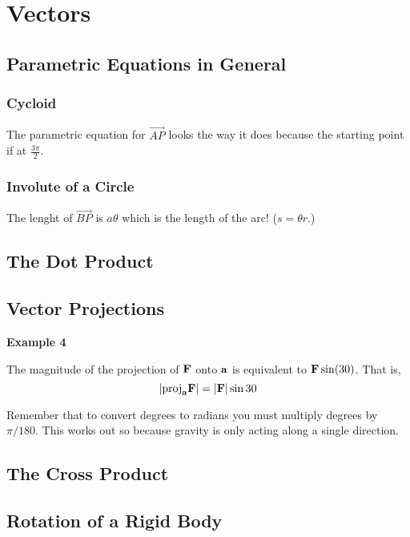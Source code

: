 \section{Vectors}

\subsection{Parametric Equations in General}

\subsubsection{Cycloid}

The parametric equation for $\overrightarrow{AP}$ looks the way it does because the starting point
if at $\frac{3\pi}{2}$.

\subsubsection{Involute of a Circle}

The lenght of $\overrightarrow{BP}$ is $a\theta$ which is the length of the arc! ($s=\theta r$.)


\subsection{The Dot Product}


\subsection{Vector Projections}

\textbf{Example 4}

The magnitude of the projection of $\boldsymbol{\mathbf{F}}$ onto $\boldsymbol{\mathbf{a}}$ is equivalent to $\boldsymbol{\mathbf{F}} \sin(30)$.
That is,
$$
|\text{proj}_{\boldsymbol{\mathbf{a}}} \boldsymbol{\mathbf{F}}| = |\boldsymbol{\mathbf{F}}| \sin 30
$$

Remember that to convert degrees to radians you must multiply degrees by $\pi / 180$.
This works out so because gravity is only acting along a single direction.


\subsection{The Cross Product}


\subsection{Rotation of a Rigid Body}

